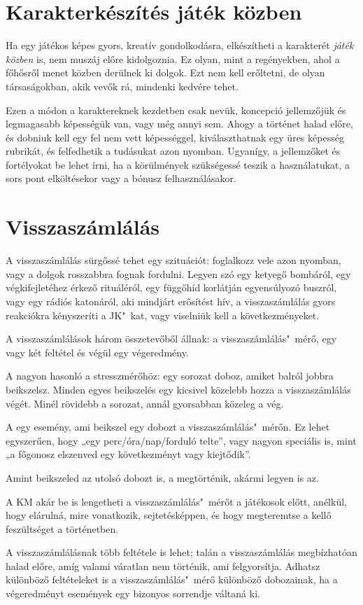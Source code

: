 \section{Karakterkészítés játék közben}

Ha egy játékos képes gyors, kreatív gondolkodásra, elkészítheti a karakterét \emph{játék közben} is, nem muszáj előre kidolgoznia. Ez olyan, mint a regényekben, ahol a főhősről menet közben derülnek ki dolgok. Ezt nem kell erőltetni, de olyan társaságokban, akik vevők rá, mindenki kedvére tehet.

Ezen a módon a karaktereknek kezdetben csak nevük, koncepció jellemzőjük és legmagasabb képességük van, vagy még annyi sem. Ahogy a történet halad előre, és dobniuk kell egy fel nem vett képességgel, kiválaszthatnak egy üres képesség rubrikát, és felfedhetik a tudásukat azon nyomban. Ugyanígy, a jellemzőket és fortélyokat be lehet írni, ha a körülmények szükségessé teszik a használatukat, a sors pont elköltésekor vagy a bónusz felhasználásakor.

\section{Visszaszámlálás}

A visszaszámlálás sürgőssé tehet egy szituációt: foglalkozz vele azon nyomban, vagy a dolgok rosszabbra fognak fordulni. Legyen szó egy ketyegő bombáról, egy végkifejletéhez érkező rituáléról, egy függőhíd korlátján egyensúlyozó buszról, vagy egy rádiós katonáról, aki mindjárt erősítést hív, a visszaszámlálás gyors reakciókra kényszeríti a JK"~kat, vagy viselniük kell a következményeket.

A visszaszámlálások három összetevőből állnak: a visszaszámlálás"~mérő, egy vagy két feltétel és végül egy végeredmény.

A  nagyon hasonló a stresszmérőhöz: egy sorozat doboz, amiket balról jobbra beikszelsz. Minden egyes beikszelés egy kicsivel közelebb hozza a visszaszámlálás végét. Minél rövidebb a sorozat, annál gyorsabban közeleg a vég.

A  egy esemény, ami beikszel egy dobozt a visszaszámlálás"~mérőn. Ez lehet egyszerűen, hogy „egy perc/óra/nap/forduló telte”, vagy nagyon speciális is, mint „a főgonosz elszenved egy következményt vagy kiejtődik”.

Amint beikszeled az utolsó dobozt is, a  megtörténik, akármi legyen is az.

A KM akár be is lengetheti a visszaszámlálás"~mérőt a játékosok előtt, anélkül, hogy elárulná, mire vonatkozik, sejtetésképpen, és hogy megteremtse a kellő feszültséget a történetben.

A visszaszámlálásnak több feltétele is lehet; talán a visszaszámlálás megbízhatóan halad előre, amíg valami váratlan nem történik, ami felgyorsítja. Adhatsz különböző feltételeket is a visszaszámlálás"~mérő különböző dobozainak, ha a végeredményt események egy bizonyos sorrendje váltaná ki.
